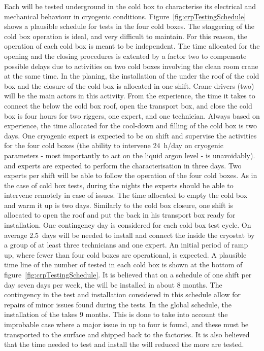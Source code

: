 Each  will be tested underground in the cold box to characterise its electrical and mechanical behaviour in cryogenic conditions.
Figure~\ref{fig:crpTestingSchedule} shows a plausible schedule for tests in the four cold boxes.
The staggering of the cold box operation is ideal, and very difficult to maintain.
For this reason, the operation of each cold box is meant to be independent.
The time allocated for the opening and the closing procedures is extented by a factor two to compensate possible delays due to activities on two cold boxes involving the clean room crane at the same time.
In the planing, the installation of the  under the roof of the cold box and the closure of the cold box is allocated in one shift.
Crane drivers (two) will be the main actors in this activity.
From the  experience, the time it takes to connect the  below the cold box roof, open the transport box, and close the cold box is four hours for two riggers, one  expert, and one technician.
Always based on  experience, the time allocated for the cool-down and filling of the cold box is two days.
One cryogenic expert is expected to be on shift and supervise the activities for the four cold boxes (the ability to intervene 24~h/day on cryogenic parameters - most importantly to act on the liquid argon level - is unavoidably).
 and  experts are expected to perform the characterisation in three days.
Two experts per shift will be able to follow the operation of the four cold boxes.
As in the case of  cold box tests, during the nights the experts should be able to intervene remotely in case of issues.
The time allocated to empty the cold box and warm it up is two days.
Similarly to the cold box closure, one shift is allocated to open the roof and put the  back in his transport box ready for installation.
One contingency day is considered for each cold box test cycle.
On average 2.5~days will be needed to install and connect the  inside the cryostat by a group of at least three technicians and one  expert.
An initial period of ramp up, where fewer than four cold boxes are operational, is expected.
A plausible time line of the number of  tested in each cold box is shown at the bottom of figure~\ref{fig:crpTestingSchedule}.
It is believed that on a schedule of one shift per day seven days per week, the  will be installed in about 8 months.
The contingency in the test and installation considered in this schedule allow for repairs of minor issues found during the tests.
In the global schedule, the installation of the  takes 9 months.
This is done to take into account the improbable case where a major issue in up to four  is found, and these  must be transported to the surface and shipped back to the factories.
It is also believed that the time needed to test and install the  will reduced the more  are tested.

